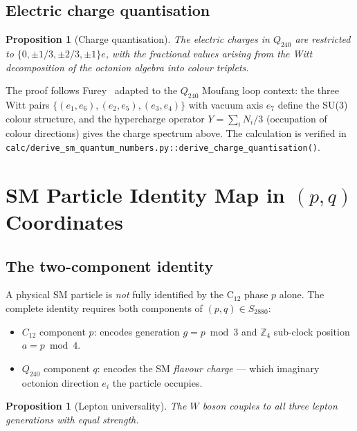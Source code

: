 \documentclass[11pt,a4paper]{article}
\newtheorem{proposition}[theorem]{Proposition}
\theoremstyle{remark}
\begin{document}
\subsection{Electric charge quantisation}

\begin{proposition}[Charge quantisation]
  The electric charges in $Q_{240}$ are restricted to
  $\{0, \pm 1/3, \pm 2/3, \pm 1\}e$, with the fractional values arising from
  the Witt decomposition of the octonion algebra into colour triplets.
\end{proposition}

The proof follows Furey~\cite{Furey2018} adapted to the $Q_{240}$ Moufang loop context:
the three Witt pairs $\{(e_1,e_6),(e_2,e_5),(e_3,e_4)\}$ with vacuum axis $e_7$
define the SU(3) colour structure, and the hypercharge operator $Y = \sum_{i} N_i/3$
(occupation of colour directions) gives the charge spectrum above.
The calculation is verified in \texttt{calc/derive\_sm\_quantum\_numbers.py::derive\_charge\_quantisation()}.

\section{SM Particle Identity Map in $(p,q)$ Coordinates}
\label{sec:particle_map}

\subsection{The two-component identity}

A physical SM particle is \emph{not} fully identified by the C$_{12}$ phase $p$ alone.
The complete identity requires both components of $(p, q) \in S_{2880}$:

\begin{itemize}
  \item $C_{12}$ component $p$: encodes generation $g = p \bmod 3$ and
        $\mathbb{Z}_4$ sub-clock position $a = p \bmod 4$.
  \item $Q_{240}$ component $q$: encodes the SM \emph{flavour charge} --- which
        imaginary octonion direction $e_i$ the particle occupies.
\end{itemize}

\begin{proposition}[Lepton universality]
  The $W$ boson couples to all three lepton generations with equal strength.
\end{proposition}
\end{document}

